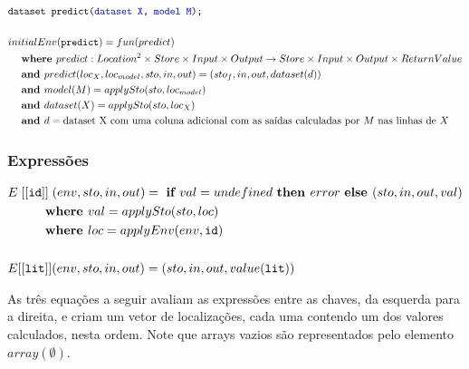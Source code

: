 \documentclass[12pt]{article}
\newcommand{\blu}{\textcolor{blue}}
\newcommand\eb[1]{[[\texttt{#1}]]}
\begin{document}
\begin{align*}
		&\texttt{dataset predict(\blu{dataset X, model M});} \\
	    \\
&initialEnv(\texttt{predict}) = fun(predict) \\
&\hspace{3ex}\textbf{where } predict:Location^2\times Store\times Input\times Output\rightarrow Store\times Input\times Output\times ReturnValue \\
&\hspace{3ex}\textbf{and } predict(loc_{X}, loc_{model},sto,in,out) = (sto_f,in,out,dataset(d))\\
&\hspace{3ex}\textbf{and } model(M) = applySto(sto, loc_{model}) \\
&\hspace{3ex}\textbf{and } dataset(X) = applySto(sto, loc_{X}) \\
&\hspace{3ex}\textbf{and } d = \text{dataset X com uma coluna adicional com as saídas calculadas por $M$ nas linhas de $X$}\\
\end{align*}

\subsubsection{Expressões}


\begin{align*}
&E\;\eb{id} \;(env, sto, in, out) = \text{ \bf if } val = undefined \text{ \bf then } error \text{ \bf else } (sto,in,out,val)  \\ 
&\hspace{6ex} \textbf{ where } val = applySto(sto, loc) \\
&\hspace{6ex} \textbf{ where } loc = applyEnv(env, \texttt{id}) \\
\\
&E[[{\tt lit}]] (env,sto,in,out) = (sto,in,out,value(\texttt{lit})) \\
\end{align*}

As três equações a seguir avaliam as expressões entre as chaves, da esquerda para a direita, e criam um vetor de localizações, cada uma contendo um dos valores calculados, nesta ordem. Note que arrays vazios são representados pelo elemento $array(\emptyset)$.
\end{document}
